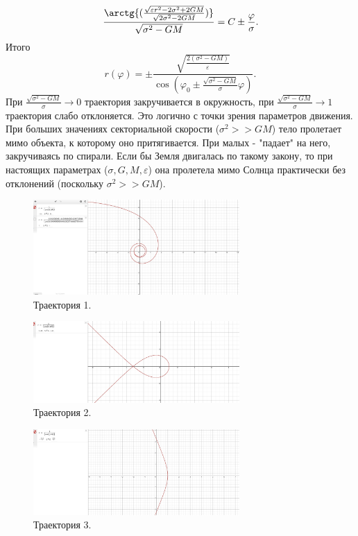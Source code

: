 \documentclass[a4paper]{article}
\begin{document}
\[
\frac{\arctg{(\frac{\sqrt{\varepsilon r^2-2\sigma^2+2GM}}{\sqrt{2\sigma^2-2GM}})}}{\sqrt{\sigma^2-GM}} = C \pm \frac{\varphi} {\sigma}.
\]
Итого
\begin{equation} \tag{5}
r(\varphi) =\pm \frac{\sqrt{\frac{2(\sigma^2-GM)}{\varepsilon}}}{\cos(\varphi_0 \pm \frac{\sqrt{\sigma^2-GM}}{\sigma}\varphi)}.
\end{equation}
При $\frac{\sqrt{\sigma^2-GM}}{\sigma} \longrightarrow 0 $ траектория закручивается в окружность, при $\frac{\sqrt{\sigma^2-GM}}{\sigma} \longrightarrow 1 $ траектория слабо отклоняется. Это логично с точки зрения параметров движения. При больших значениях секториальной скорости ($\sigma^2 >> GM$) тело пролетает мимо объекта, к которому оно притягивается. При малых - "падает" на него, закручиваясь по спирали.
Если бы Земля двигалась по такому закону, то при настоящих параметрах ($\sigma, G, M, \varepsilon$) она пролетела мимо Солнца практически без отклонений (поскольку $\sigma^2 >> GM$).

\begin{figure}[h]
    \centering
    \includegraphics[width=0.7\textwidth]{Graphic2_1.jpg}
    \caption{Траектория 1.}
\end{figure}

\begin{figure}[h]
    \centering
    \includegraphics[width=0.7\textwidth]{Graphic2_2.jpg}
    \caption{Траектория 2.}
\end{figure}

\begin{figure}[h]
    \centering
    \includegraphics[width=0.7\textwidth]{Graphic2_3.jpg}
    \caption{Траектория 3.}
\end{figure}
\clearpage
\end{document}
